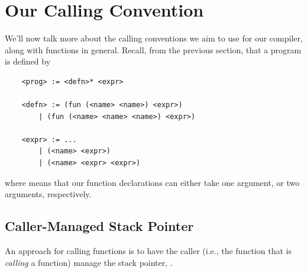 \section{Our Calling Convention}
We'll now talk more about the calling conventions we aim to use for our compiler, along with functions in general. Recall, from the previous section, that a  program is defined by 
\begin{verbatim}
    <prog> := <defn>* <expr>

    <defn> := (fun (<name> <name>) <expr>)
        | (fun (<name> <name> <name>) <expr>)

    <expr> := ... 
        | (<name> <expr>) 
        | (<name> <expr> <expr>)\end{verbatim}
where  means that our function declarations can either take one argument, or two arguments, respectively.

\subsection{Caller-Managed Stack Pointer}
An approach for calling functions is to have the caller (i.e., the function that is \emph{calling} a function) manage the stack pointer, .

